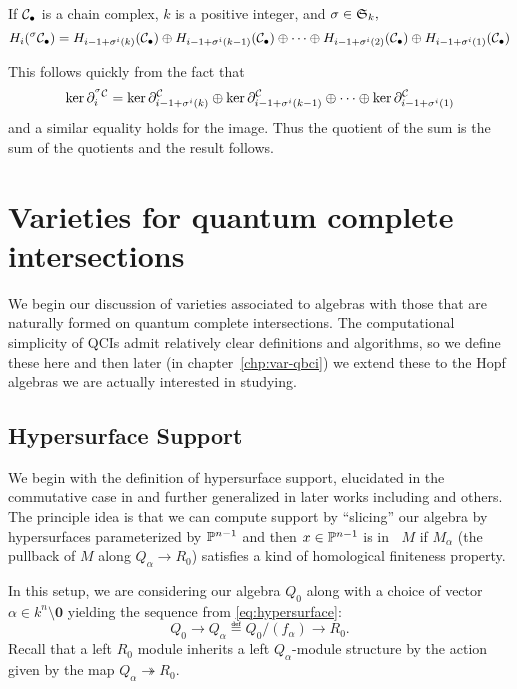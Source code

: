 \documentclass [11pt, proquest] {uwthesis}[2020/02/24]
\DeclareMathOperator{\supph}{supp^\mathit{hyp}}
\begin{document}
    
    
    \begin{prop}\label{prop:homology}
        If $\mathcal{C}_\bullet$ is a chain complex, $k$ is a positive integer, and $\sigma\in\mathfrak{S}_k,$
        \[H_i(^\sigma\mathcal{C}_\bullet)=H_{i-1+\sigma^i(k)}(\mathcal{C}_\bullet)\oplus H_{i-1+\sigma^i(k-1)}(\mathcal{C}_\bullet)\oplus\cdots\oplus H_{i-1+\sigma^i(2)}(\mathcal{C}_\bullet)\oplus H_{i-1+\sigma^i(1)}(\mathcal{C}_\bullet)\]
    \end{prop}
    \begin{prf}
        This follows quickly from the fact that
        \[\ker\partial^{^\sigma\mathcal{C}}_i=\ker\partial^{\mathcal{C}}_{i-1+\sigma^i(k)}\oplus\ker\partial^{\mathcal{C}}_{i-1+\sigma^i(k-1)}\oplus\cdots\oplus \ker\partial^{\mathcal{C}}_{i-1+\sigma^i(1)}\]
        and a similar equality holds for the image. Thus the quotient of the sum is the sum of the quotients and the result follows.
    \end{prf}


\chapter{Varieties for quantum complete intersections}
We begin our discussion of varieties associated to algebras with those that are naturally formed on quantum complete intersections. The computational simplicity of QCIs admit relatively clear definitions and algorithms, so we define these here and then later (in chapter~\ref{chp:var-qbci}) we extend these to the Hopf algebras we are actually interested in studying.

\section{Hypersurface Support}
    We begin with the definition of hypersurface support, elucidated in the commutative case in \cite{avramov-iyengar} and further generalized in later works including \cite{negron-pevtsovaI} and others. The principle idea is that we can compute support by ``slicing'' our algebra by hypersurfaces parameterized by $\mathbb{P}^{n-1}$ and then $x\in\mathbb{P}^{n-1}$ is in $\supph M$ if $M_\alpha$ (the pullback of $M$ along $Q_\alpha\to R_0$) satisfies a kind of homological finiteness property. 
    
    In this setup, we are considering our algebra $Q_0$ along with a choice of vector $\alpha\in k^n\setminus\mathbf{0}$ yielding the sequence from \eqref{eq:hypersurface}:
    \[Q_0\to Q_\alpha\eqdef Q_0/(f_\alpha)\to R_0.\]
    Recall that a left $R_0$ module inherits a left $Q_\alpha$-module structure by the action given by the map $Q_\alpha\twoheadrightarrow R_0.$
    
\end{document}
